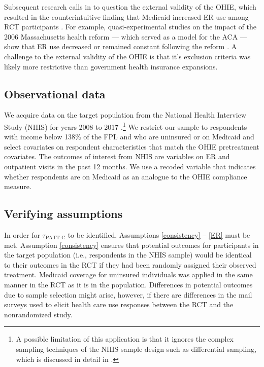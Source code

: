 \documentclass[hidelinks,12pt]{article}
\begin{document}
{{Subsequent research calls in to question the external validity of the OHIE, which resulted in the counterintuitive finding that Medicaid increased ER use among RCT participants \citep{finkelstein2012,Taubman}. For example, quasi-experimental studies on the impact of the 2006 Massachusetts health reform --- which served as a model for the ACA --- show that ER use decreased or remained constant following the reform \citep{miller2012effect, kolstad2012impact}. A challenge to the external validity of the OHIE is that it's exclusion criteria was likely more restrictive than government health insurance expansions. 
}

\subsection{Observational data} 

We acquire data on the target population from the National Health Interview Study (NHIS) for years {\color{red}2008 to 2017} \citep{NHIS}.\footnote{{\color{red}A possible limitation of this application is that it ignores the complex sampling techniques of the NHIS sample design such as differential sampling, which is discussed in detail in \citet{parsons2014design}.}\label{nhis-ftn}} We restrict our sample to respondents with income below 138\% of the FPL and who are uninsured or on Medicaid and select covariates on respondent characteristics that match the OHIE pretreatment covariates. The outcomes of interest from NHIS are variables on ER and outpatient visits in the past 12 months. We use a recoded variable that indicates whether respondents are on Medicaid as an analogue to the OHIE compliance measure. 

\subsection{Verifying assumptions} \label{verifying}

In order for $\tau_{\text{PATT-C}}$ to be identified, Assumptions \ref{consistency} -- \ref{ER} must be met. Assumption \ref{consistency} ensures that potential outcomes for participants in the target population (i.e., respondents in the NHIS sample) would be identical to their outcomes in the RCT if they had been randomly assigned their observed treatment. {\color{red}Medicaid coverage for uninsured individuals was applied in the same manner in the RCT as it is in the population.  Differences in potential outcomes due to sample selection might arise, however, if there are differences in the mail surveys used to elicit health care use responses between the RCT and the nonrandomized study. }
 
}
\end{document}
